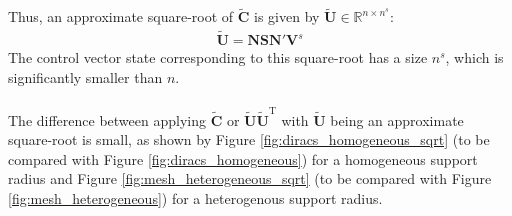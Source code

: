 \documentclass[12pt]{scrartcl}
\begin{document}
Thus, an approximate square-root of $\widetilde{\mathbf{C}}$ is given by $\widetilde{\mathbf{U}} \in \mathbb{R}^{n \times n^s}$:
\begin{align}
\widetilde{\mathbf{U}} = \mathbf{N} \mathbf{S} \mathbf{N}' \mathbf{V}^s
\end{align}
The control vector state corresponding to this square-root has a size $n^s$, which is significantly smaller than $n$.\\
$  $\\
The difference between applying $\widetilde{\mathbf{C}}$ or $\widetilde{\mathbf{U}} \widetilde{\mathbf{U}}^\textrm{T}$ with $\widetilde{\mathbf{U}}$ being an approximate square-root is small, as shown by Figure \ref{fig:diracs_homogeneous_sqrt} (to be compared with Figure \ref{fig:diracs_homogeneous}) for a homogeneous support radius and Figure \ref{fig:mesh_heterogeneous_sqrt} (to be compared with Figure \ref{fig:mesh_heterogeneous}) for a heterogenous support radius.
\end{document}
